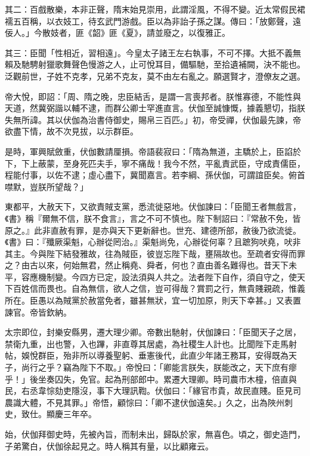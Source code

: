 \begin{pinyinscope}
 其二：百戲散樂，本非正聲，隋末始見崇用，此謂淫風，不得不變。近太常假民裙襦五百稱，以衣妓工，待玄武門游戲。臣以為非詒子孫之謀。傳曰：「放鄭聲，遠佞人。」今散妓者，匪《韶》匪《夏》，請並廢之，以復雅正。



 其三：臣聞「性相近，習相遠」。今皇太子諸王左右執事，不可不擇。大抵不義無賴及馳騁射獵歌舞聲色慢游之人，止可悅耳目，備驅馳，至拾遺補闕，決不能也。泛觀前世，子姓不克孝，兄弟不克友，莫不由左右亂之。願選賢才，澄僚友之選。



 帝大悅，即詔：「周、隋之晚，忠臣結舌，是謂一言喪邦者。朕惟寡德，不能性與天道，然冀弼諧以輔不逮，而群公卿士罕進直言。伏伽至誠慷慨，據義懇切，指朕失無所諱。其以伏伽為治書侍御史，賜帛三百匹。」初，帝受禪，伏伽最先諫，帝欲盡下情，故不次見拔，以示群臣。



 是時，軍興賦斂重，伏伽數請厘損。帝語裴寂曰：「隋為無道，主驕於上，臣諂於下，下上蔽蒙，至身死匹夫手，寧不痛哉！我今不然，平亂責武臣，守成責儒臣，程能付事，以佐不逮；虛心盡下，冀聞嘉言。若李綱、孫伏伽，可謂誼臣矣。俯首噤默，豈朕所望哉？」



 東都平，大赦天下，又欲責賊支黨，悉流徙惡地。伏伽諫曰：「臣聞王者無戲言，《書》稱『爾無不信，朕不食言』，言之不可不慎也。陛下制詔曰：『常赦不免，皆原之。』此非直赦有罪，是亦與天下更新辭也。世充、建德所部，赦後乃欲流徙。《書》曰：『殲厥渠魁，心辦從罔治。』渠魁尚免，心辦從何辜？且蹠狗吠堯，吠非其主。今與陛下結發雅故，往為賊臣，彼豈忘陛下哉，壅隔故也。至疏者安得而罪之？由古以來，何始無君，然止稱堯、舜者，何也？直由善名難得也。昔天下未平，容應機制變。今四方已定，設法須與人共之。法者陛下自作，須自守之，使天下百姓信而畏也。自為無信，欲人之信，豈可得哉？賞罰之行，無貴賤親疏，惟義所在。臣愚以為賊黨於赦當免者，雖甚無狀，宜一切加原，則天下幸甚。」又表置諫官。帝皆欽納。



 太宗即位，封樂安縣男，遷大理少卿。帝數出馳射，伏伽諫曰：「臣聞天子之居，禁衛九重，出也警，入也蹕，非直尊其居處，為社稷生人計也。比聞陛下走馬射帖，娛悅群臣，殆非所以導養聖躬、垂憲後代，此直少年諸王務耳，安得既為天子，尚行之乎？竊為陛下不取。」帝悅曰：「卿能言朕失，朕能改之，天下庶有瘳乎！」後坐奏囚失，免官。起為刑部郎中。累遷大理卿。時司農市木橦，倍直與民，右丞韋悰劾吏隱沒，事下大理訊鞫。伏伽曰：「緣官市貴，故民直賤。臣見司農識大體，不見其罪。」帝悟，顧悰曰：「卿不逮伏伽遠矣。」久之，出為陜州刺史，致仕。顯慶三年卒。



 始，伏伽拜御史時，先被內旨，而制未出，歸臥於家，無喜色。頃之，御史造門，子弟驚白，伏伽徐起見之。時人稱其有量，以比顧雍云。




\end{pinyinscope}
